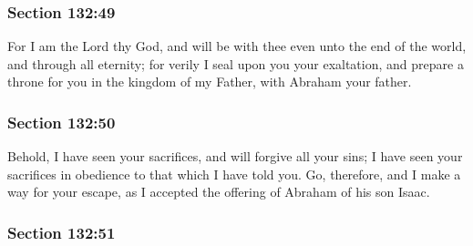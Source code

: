 
	\subsubsection{Section 132:49} %
		\label{DC132-49}

		For I am the Lord thy God, and will be with thee even unto the end of the world, and through all eternity; for verily I seal upon you your exaltation, and prepare a throne for you in the kingdom of my Father, with Abraham your father.


	\subsubsection{Section 132:50} %
		\label{DC132-50}

		Behold, I have seen your sacrifices, and will forgive all your sins; I have seen your sacrifices in obedience to that which I have told you. Go, therefore, and I make a way for your escape, as I accepted the offering of Abraham of his son Isaac.


	\subsubsection{Section 132:51} %
		\label{DC132-51}

